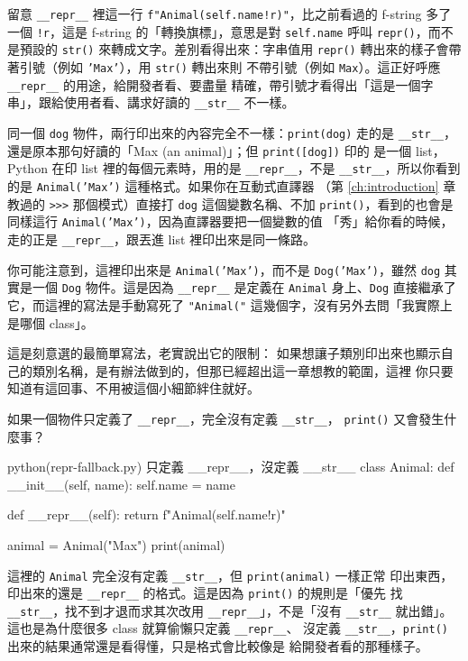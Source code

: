 留意 \texttt{\_\_repr\_\_} 裡這一行 \texttt{f"Animal({self.name!r})"}，比之前看過的 f-string
多了一個 \texttt{!r}，這是 f-string 的「轉換旗標」，意思是對 \texttt{self.name} 呼叫
\texttt{repr()}，而不是預設的 \texttt{str()} 來轉成文字。差別看得出來：字串值用
\texttt{repr()} 轉出來的樣子會帶著引號（例如 \texttt{'Max'}），用 \texttt{str()} 轉出來則
不帶引號（例如 \texttt{Max}）。這正好呼應 \texttt{\_\_repr\_\_} 的用途，給開發者看、要盡量
精確，帶引號才看得出「這是一個字串」，跟給使用者看、講求好讀的 \texttt{\_\_str\_\_} 不一樣。

同一個 \texttt{dog} 物件，兩行印出來的內容完全不一樣：\texttt{print(dog)} 走的是
\texttt{\_\_str\_\_}，還是原本那句好讀的「Max (an animal)」；但 \texttt{print([dog])} 印的
是一個 list，Python 在印 list 裡的每個元素時，用的是 \texttt{\_\_repr\_\_}，不是
\texttt{\_\_str\_\_}，所以你看到的是 \texttt{Animal('Max')} 這種格式。如果你在互動式直譯器
（第 \ref{ch:introduction} 章教過的 \texttt{>>>} 那個模式）直接打 \texttt{dog} 這個變數名稱、不加
\texttt{print()}，看到的也會是同樣這行 \texttt{Animal('Max')}，因為直譯器要把一個變數的值
「秀」給你看的時候，走的正是 \texttt{\_\_repr\_\_}，跟丟進 list 裡印出來是同一條路。

你可能注意到，這裡印出來是 \texttt{Animal('Max')}，而不是 \texttt{Dog('Max')}，雖然
\texttt{dog} 其實是一個 \texttt{Dog} 物件。這是因為 \texttt{\_\_repr\_\_} 是定義在
\texttt{Animal} 身上、\texttt{Dog} 直接繼承了它，而這裡的寫法是手動寫死了 \texttt{"Animal("}
這幾個字，沒有另外去問「我實際上是哪個 class」。

這是刻意選的最簡單寫法，老實說出它的限制：
如果想讓子類別印出來也顯示自己的類別名稱，是有辦法做到的，但那已經超出這一章想教的範圍，這裡
你只要知道有這回事、不用被這個小細節絆住就好。

如果一個物件只定義了 \texttt{\_\_repr\_\_}，完全沒有定義 \texttt{\_\_str\_\_}，
\texttt{print()} 又會發生什麼事？

\begin{example}{python}{(repr-fallback.py) 只定義 \_\_repr\_\_，沒定義 \_\_str\_\_}
class Animal:
    def __init__(self, name):
        self.name = name

    def __repr__(self):
        return f"Animal({self.name!r})"


animal = Animal("Max")
print(animal)
\end{example}


這裡的 \texttt{Animal} 完全沒有定義 \texttt{\_\_str\_\_}，但 \texttt{print(animal)} 一樣正常
印出東西，印出來的還是 \texttt{\_\_repr\_\_} 的格式。這是因為 \texttt{print()} 的規則是「優先
找 \texttt{\_\_str\_\_}，找不到才退而求其次改用 \texttt{\_\_repr\_\_}」，不是「沒有
\texttt{\_\_str\_\_} 就出錯」。這也是為什麼很多 class 就算偷懶只定義 \texttt{\_\_repr\_\_}、
沒定義 \texttt{\_\_str\_\_}，\texttt{print()} 出來的結果通常還是看得懂，只是格式會比較像是
給開發者看的那種樣子。

